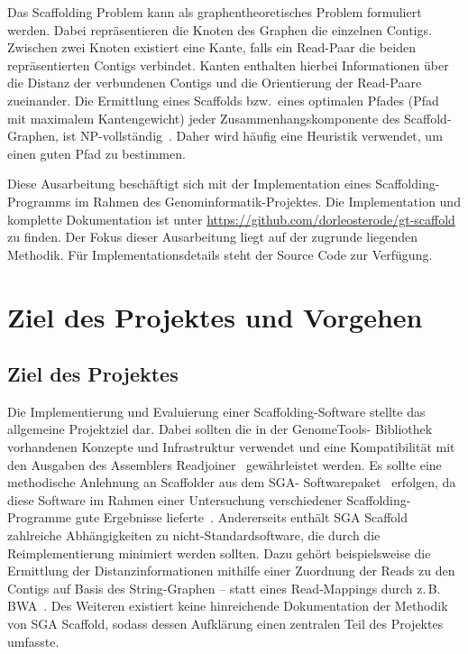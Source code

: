 \documentclass[a4paper,11pt,parskip,abstract=on]{scrartcl}
\begin{document}
Das Scaffolding Problem kann als graphentheoretisches Problem formuliert
werden. Dabei repräsentieren die Knoten des Graphen die einzelnen Contigs.
Zwischen zwei Knoten existiert eine Kante, falls ein Read-Paar die beiden
repräsentierten Contigs verbindet. Kanten enthalten hierbei Informationen über
die Distanz der verbundenen Contigs und die Orientierung der Read-Paare
zueinander. Die Ermittlung eines Scaffolds bzw.\ eines optimalen Pfades (Pfad
mit maximalem Kantengewicht) jeder Zusammenhangskomponente des Scaffold-
Graphen, ist NP-vollständig~\cite{Huson:2002kf}. Daher wird häufig eine
Heuristik verwendet, um einen guten Pfad zu bestimmen.

Diese Ausarbeitung beschäftigt sich mit der Implementation eines
Scaffolding-Programms im Rahmen des Genominformatik-Projektes. Die
Implementation und komplette Dokumentation ist unter
\url{https://github.com/dorleosterode/gt-scaffold} zu finden. Der Fokus dieser
Ausarbeitung liegt auf der zugrunde liegenden Methodik. Für
Implementationsdetails steht der Source Code zur Verfügung.

\section{Ziel des Projektes und Vorgehen} \subsection{Ziel des Projektes} Die
Implementierung und Evaluierung einer Scaffolding-Software stellte das
allgemeine Projektziel dar. Dabei sollten die in der GenomeTools-
Bibliothek~\cite{Gremme:2013} vorhandenen Konzepte und Infrastruktur verwendet
und eine Kompatibilität mit den Ausgaben des Assemblers
Readjoiner~\cite{Gonnella:2012gn} gewährleistet werden. Es sollte eine
methodische Anlehnung an Scaffolder aus dem SGA-
Softwarepaket~\cite{Simpson:2012ef} erfolgen, da diese Software im Rahmen
einer Untersuchung verschiedener Scaffolding-Programme gute Ergebnisse
lieferte~\cite{Hunt:2014dh}. Andererseits enthält SGA Scaffold zahlreiche
Abhängigkeiten zu nicht-Standardsoftware, die durch die Reimplementierung
minimiert werden sollten. Dazu gehört beispielsweise die Ermittlung der
Distanzinformationen mithilfe einer Zuordnung der Reads zu den Contigs auf
Basis des String-Graphen -- statt eines Read-Mappings durch z.\,B.
BWA~\cite{Li:2009}. Des Weiteren existiert keine hinreichende Dokumentation
der Methodik von SGA Scaffold, sodass dessen Aufklärung einen zentralen Teil
des Projektes umfasste.
\end{document}
